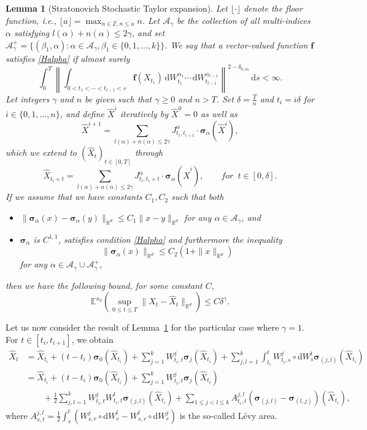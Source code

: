 \documentclass[10pt]{amsart}
\newcounter{dummy} \numberwithin{dummy}{section}
\newtheorem{lemma}[dummy]{Lemma}
\theoremstyle{remark}
\newcommand{\calA}{\mathcal{A}}
\newcommand{\bfsigma}{\boldsymbol \sigma}
\newcommand{\E}{\mathbb{E}}
\newcommand{\R}{\mathbb{R}}
\newcommand{\dd}{\,{\mathrm d}}
\newcommand{\db}{{\mathrm d}}
\numberwithin{equation}{section}
\begin{document}
\begin{lemma}[Stratonovich Stochastic Taylor expansion]\label{lem:stratstochtaylor}
Let $\lfloor \cdot \rfloor$ denote the floor function, i.e., $\lfloor a \rfloor = \max_{n \in \mathbb{Z}, n \leq a } n$. Let $\calA_\gamma$ be the collection of all multi-indices $\alpha$ satisfying $l(\alpha) +n(\alpha) \leq 2 \gamma$, and set $\calA_\gamma^+ = \{ (\beta_1, \alpha) : \alpha \in \calA_\gamma, \beta_1 \in\{0,1,\dots, k\}\}$. We say that a vector-valued function $\mathbf{f}$ satisfies \eqref{Halpha} if almost surely
\begin{equation} \tag{$H_\alpha$} \label{Halpha}
\int_{0}^T \left\| \int_{0<t_1< \cdots <t_{l-1}<s} \mathbf{f}(X_{t_1}) \dd W_{t_1}^{\alpha_1} \cdots \dd W_{t_{l-1}}^{\alpha_{l-1}}\right\|^{2-\delta_{0,\alpha_l}} \dd s < \infty.
\end{equation}
Let integers $\gamma$ and $n$ be given such that $\gamma\geq 0$ and $n>T$. Set $\delta = \frac{T}{n}$ and $t_i = i \delta$ for $i\in\{0,1, \dots,n\}$, and define $\hat X^i$ iteratively by $\hat X^0 = 0$ as well as
$$\hat X^{i+1} = \sum_{l(\alpha) + n(\alpha)\leq 2\gamma} J_{t_{i},t_{i+1}}^\alpha \cdot \bfsigma_{\alpha}(\hat X^{i}),$$
which we extend to $(\hat X_t)_{t\in[0,T]}$ through
$$\hat X_{t_i+t} = \sum_{l(\alpha) + n(\alpha)\leq 2\gamma} J_{t_{i},t_{i}+t}^\alpha \cdot \bfsigma_{\alpha}(\hat X^{i}) , \qquad for\enspace t\in [0, \delta].$$
If we assume that we have constants $C_1, C_2$ such that both
\begin{itemize}
\item $\| \bfsigma_\alpha(x) - \bfsigma_\alpha(y)\|_{\R^d} \leq C_1 \|x-y\|_{\R^d}$ for any $\alpha \in \calA_\gamma$, and
\item $\bfsigma_\alpha$ is $C^{1,1}$, satisfies condition \eqref{Halpha} and furthermore the inequality
$$\| \bfsigma_{\alpha}(x) \|_{\R^d} \leq C_2(1+\|x\|_{\R^d})$$
for any $\alpha \in \calA_\gamma \cup \calA_\gamma^+$,
\end{itemize}
then we have the following bound, for some constant $C$,
$$\E^{x_0}\left(\sup_{0 \leq t \leq T} \| X_t - \hat X_t\|_{\R^d} \right) \leq C \delta^\gamma.$$
\end{lemma}


Let us now consider the result of Lemma~\ref{lem:stratstochtaylor} for the particular case where $\gamma=1$. For $t \in [t_i, t_{i+1}]$, we obtain
\begin{align*}
\hat X_t &= \hat X_{t_{i}} + (t-t_i) \bfsigma_0(\hat X_{t_{i}}) + \sum_{j=1}^k W^j_{t_i,t} \bfsigma_j(\hat X_{t_{i}})  + \sum_{j,l=1}^k  \int_{t_{i}}^{t} W^j_{t_{i},s} \circ \db W_s^l \bfsigma_{(j,l)}(\hat X_{t_{i}})  \\
&= \hat X_{t_{i}} + (t-t_i) \bfsigma_0(\hat X_{t_{i}}) + \sum_{j=1}^k W^j_{t_i,t} \bfsigma_j(\hat X_{t_{i}})  \\
& \qquad + \frac{1}{2} \sum_{j,l=1}^k  W_{t_{i},t}^j W_{t_i,t}^{l} \bfsigma_{(j,l)}(\hat X_{t_{i}})   + \sum_{1\leq j<l\leq k} A^{j,l}_{t_i,t} (\bfsigma_{(j,l)}-\bfsigma_{(l,j)})(\hat X_{t_{i}}), 
\end{align*}
where $A_{s,t}^{j,l} = \frac{1}{2} \int_s^t (W_{s,r}^{j} \circ \db W^{l}_r-  W_{s,r}^{l} \circ \db W^{j}_r)$ is the so-called Lévy area.
\end{document}
